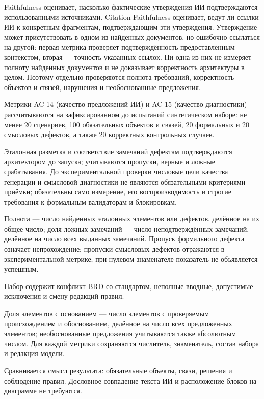 \documentclass[10pt,a4paper]{article}
\begin{document}
Faithfulness оценивает, насколько фактические утверждения ИИ подтверждаются использованными источниками. Citation Faithfulness оценивает, ведут ли ссылки ИИ к конкретным фрагментам, подтверждающим эти утверждения. Утверждение может присутствовать в одном из найденных документов, но ошибочно ссылаться на другой: первая метрика проверяет подтверждённость предоставленным контекстом, вторая --- точность указанных ссылок. Ни одна из них не измеряет полноту найденных документов и не доказывает корректность архитектуры в целом. Поэтому отдельно проверяются полнота требований, корректность объектов и связей, нарушения и необоснованные предложения.

Метрики AC-14 (качество предложений ИИ) и AC-15 (качество диагностики) рассчитываются на зафиксированном до испытаний синтетическом наборе: не менее 20 сценариев, 100 обязательных объектов и связей, 20 формальных и 20 смысловых дефектов, а также 20 корректных контрольных случаев.

Эталонная разметка и соответствие замечаний дефектам подтверждаются архитектором до запуска; учитываются пропуски, верные и ложные срабатывания. До экспериментальной проверки числовые цели качества генерации и смысловой диагностики не являются обязательными критериями приёмки; обязательны само измерение, его воспроизводимость и строгие требования к формальным валидаторам и блокировкам.

Полнота --- число найденных эталонных элементов или дефектов, делённое на их общее число; доля ложных замечаний --- число неподтверждённых замечаний, делённое на число всех выданных замечаний. Пропуск формального дефекта означает непрохождение; пропуски смысловых дефектов отражаются в экспериментальной метрике; при нулевом знаменателе показатель не объявляется успешным.

Набор содержит конфликт BRD со стандартом, неполные вводные, допустимые исключения и смену редакций правил.

Доля элементов с основанием --- число элементов с проверяемым происхождением и обоснованием, делённое на число всех предложенных элементов; необоснованные предложения учитываются также абсолютным числом. Для каждой метрики сохраняются числитель, знаменатель, состав набора и редакция модели.

Сравнивается смысл результата: обязательные объекты, связи, решения и соблюдение правил. Дословное совпадение текста ИИ и расположение блоков на диаграмме не требуются.
\end{document}
